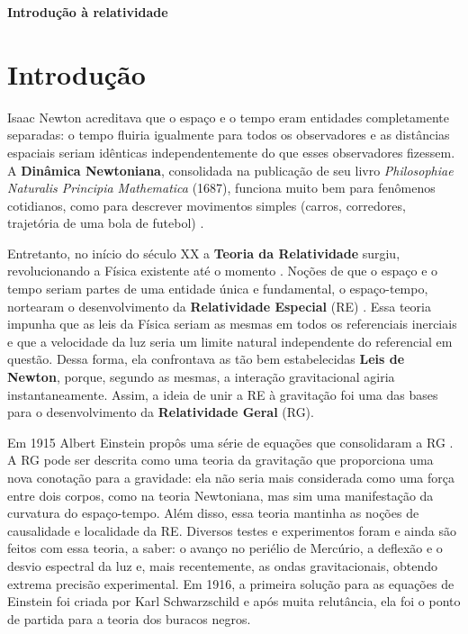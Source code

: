 \documentclass[12pt,a4paper,titlepage,brazil]{article}
\begin{document}
\begin{center}
 \LARGE{\bf Introdução à relatividade}
\end{center}


\section{Introdução}

Isaac Newton acreditava que o espaço e o tempo eram entidades completamente separadas: o tempo fluiria igualmente para todos os observadores e as distâncias espaciais seriam idênticas independentemente do que esses observadores fizessem. A {\bf Dinâmica Newtoniana}, consolidada na publicação de seu livro {\em Philosophiae Naturalis Principia Mathematica} (1687), funciona muito bem para fenômenos cotidianos, como para descrever movimentos simples (carros, corredores, trajetória de uma bola de futebol) \cite{nightingale2006}.

Entretanto, no início do século XX a {\bf Teoria da Relatividade} surgiu, revolucionando a Física existente até o momento \cite{pires2011}. Noções de que o espaço e o tempo seriam partes de uma entidade única e fundamental, o espaço-tempo, nortearam o desenvolvimento da {\bf Relatividade Especial} (RE) \cite{einstein1905, martins2005}. Essa teoria impunha que as leis da Física seriam as mesmas em todos os referenciais inerciais e que a velocidade da luz seria um limite natural independente do referencial em questão. Dessa forma, ela confrontava as tão bem estabelecidas {\bf Leis de Newton}, porque, segundo as mesmas, a interação gravitacional agiria instantaneamente. Assim, a ideia de unir a RE à gravitação foi uma das bases para o desenvolvimento da {\bf Relatividade Geral} (RG).

Em 1915 Albert Einstein propôs uma série de equações que consolidaram a RG \cite{einstein1915}. A RG pode ser descrita como uma teoria da gravitação que proporciona uma nova conotação para a gravidade: ela não seria mais considerada como uma força entre dois corpos, como na teoria Newtoniana, mas sim uma manifestação da curvatura do espaço-tempo. Além disso, essa teoria mantinha as noções de causalidade e localidade da RE. Diversos testes e experimentos foram e ainda são feitos com essa teoria, a saber: o avanço no periélio de Mercúrio, a deflexão e o desvio espectral da luz e, mais recentemente, as ondas gravitacionais, obtendo extrema precisão experimental. Em 1916, a primeira solução para as equações de Einstein foi criada por Karl Schwarzschild \cite{schwarzschild1916} e após muita relutância, ela foi o ponto de partida para a teoria dos buracos negros.
\end{document}
